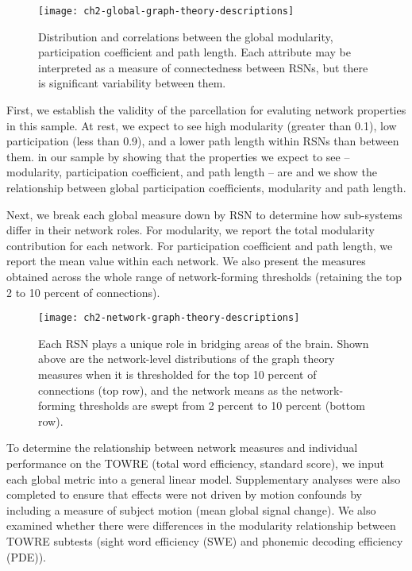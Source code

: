\begin{figure}[t]
    \centering
    \texttt{[image: ch2-global-graph-theory-descriptions]}
    \caption[Distribution and correlations between global graph theory measures.]{Distribution and correlations between the global modularity, participation coefficient and path length. Each attribute may be interpreted as a measure of connectedness between RSNs, but there is significant variability between them.}
    \label{fig:ch2-global-graph-theory-descriptions}
\end{figure}

First, we establish the validity of the parcellation for evaluting network properties in this sample. At rest, we expect to see high modularity (greater than 0.1), low participation (less than 0.9), and a lower path length within RSNs than between them.  in our sample by showing that the properties we expect to see -- modularity, participation coefficient, and path length -- are  and we show the relationship between global participation coefficients, modularity and path length. 

Next, we break each global measure down by RSN to determine how sub-systems differ in their network roles. For modularity, we report the total modularity contribution for each network. For participation coefficient and path length, we report the mean value within each network. We also present the measures obtained across the whole range of network-forming thresholds (retaining the top 2 to 10 percent of connections). 

\begin{figure}[t]
    \centering
    \texttt{[image: ch2-network-graph-theory-descriptions]}
    \caption[Relationships between network-level graph theory measures.]{Each RSN plays a unique role in bridging areas of the brain. Shown above are the network-level distributions of the graph theory measures when it is thresholded for the top 10 percent of connections (top row), and the network means as the network-forming thresholds are swept from 2 percent to 10 percent (bottom row).}
    \label{fig:ch2-network-graph-theory-descriptions}
\end{figure}

To determine the relationship between network measures and individual performance on the TOWRE (total word efficiency, standard score), we input each global metric into a general linear model. Supplementary analyses were also completed to ensure that effects were not driven by motion confounds by including a measure of subject motion (mean global signal change). We also examined whether there were differences in the modularity relationship between TOWRE subtests (sight word efficiency (SWE) and phonemic decoding efficiency (PDE)).

